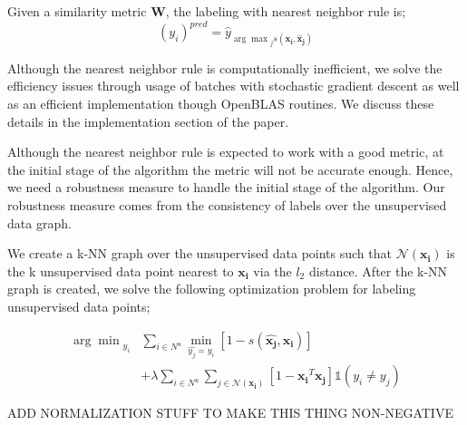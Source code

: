 Given a similarity metric $\mathbf{W}$, the labeling with nearest neighbor rule is;
\begin{equation}
(y_i)^{pred} = \hat{y}_{{\arg\max}_j s(\mathbf{x_i}, \mathbf{\hat{x}_j})}
\end{equation}

Although the nearest neighbor rule is computationally inefficient, we solve the efficiency issues through usage of batches with stochastic gradient descent as well as an efficient implementation though OpenBLAS routines. We discuss these details in the implementation section of the paper.

Although the nearest neighbor rule is expected to work with a good metric, at the initial stage of the algorithm the metric will not be accurate enough. Hence, we need a robustness measure to handle the initial stage of the algorithm. Our robustness measure comes from the consistency of labels over the unsupervised data graph.

We create a k-NN graph over the unsupervised data points such that $\mathcal{N}(\mathbf{x_i})$ is the k  unsupervised data point nearest to $\mathbf{x_i}$ via the $l_2$ distance. After the k-NN graph is created, we solve the following optimization problem for labeling unsupervised data points;

\begin{equation}
\begin{aligned}
{\arg\min}_{y_i}  &\sum_{i \in N^u} \min_{\hat{y_j}=y_i} [1 - s(\mathbf{\hat{x_j}},\mathbf{x_{i}})] \\
&+ \lambda
\sum_{i \in N^u} \sum_{j \in \mathcal{N}(\mathbf{x_i})} [1 - \mathbf{x_i}^T \mathbf{x_j}] \mathds{1}(y_i \neq y_j)
\end{aligned}
\end{equation}

ADD NORMALIZATION STUFF TO MAKE THIS THING NON-NEGATIVE 


